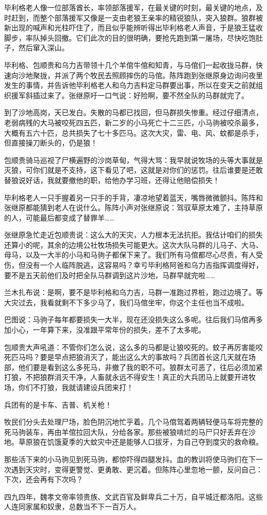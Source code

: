 \par 毕利格老人像一位部落酋长，率领部落援军，在最关键的时刻，最关键的地点，及时赶到，而整个部落援军又像是一支由老狼王亲率的精锐狼队，突入狼群。狼群被新出现的喊声和光柱吓住了，而且似乎能辨听得出毕利格老人声音，于是狼王猛收脚步，率队掉头回撤。它们此次的目的很明确，要抢先跑到第一屠场，尽快吃饱肚子，然后窜入深山。
\par 毕利格、包顺贵和乌力吉带领十几个羊倌牛倌和知青，与马倌们一起收拢马群，快速向沙地聚拢，并派了两个牧民去照顾摔伤的马倌。陈阵跑到张继原身边询问夜里发生的事情，并告诉他毕利格老人和乌力吉料定马群要出事，所以在变天之前就组织援军斜插过来了。张继原吁一口气说：好险啊，要不然全队的马群就完了。
\par 到了沙地高岗，天已发白。失散的马都已找回，但马群损失惨重。经过仔细清点，老弱病残的大马被咬死四五匹，新二岁的小马死亡十二三匹，小马驹被咬杀最多，大概有五六十匹，总共损失了七十多匹马。这次大灾，雷、电、风、蚊都是杀手，但直接操刀断头的，仍是狼！
\par 包顺贵骑马巡视了尸横遍野的沙岗草甸，气得大骂：我早就说牧场的头等大事就是灭狼，可你们就是不支持，这下看见了吧，这就是对你们的惩罚。往后谁要是还敢替狼说好话，我就要撤他的职，给他办学习班，还得让他赔偿损失！
\par 毕利格老人一只手握着另一只手的手背，凄凉地望着蓝天，嘴唇微微颤抖。陈阵和张继原都能猜到老人在说什么。陈阵小声对张继原说：驾驭草原太难了，主持草原的人，可能最后都变成了替罪羊……
\par 张继原急忙走近包顺贵说：这么大的天灾，人力根本无法抗拒。我估计咱们的损失还算小的呢，其余的边境公社牧场损失可能更大。这次大队马群的儿马子、大马、母马，以及一大半的小马和马驹子都保下来了。我们所有马倌都尽心尽责，有人受伤，但没有一个人临阵脱逃，这容易吗？幸亏毕利格阿爸和乌力吉指挥调度得好，要不是五天前他们及时把全队马群调到这片沙地，马群早就完啦……
\par 兰木扎布说：是啊，要不是毕利格和乌力吉，马群一准跑过界桩，跑过边境了。等大灾过去，我看就剩不下多少马了，我们马倌坐牢，你这个主任也当不成啦。
\par 巴图说：马驹子每年都要损失一大半，现在还没损失这么多呢。往后我们马倌再多加小心，一年算下来，没准跟平常年份的损失，差不了太多呢。
\par 包顺贵大声吼道：不管你们怎么说，这么多的马都是让狼咬死的。蚊子再厉害能咬死匹马吗？要是早点把狼消灭了，能出这么大的事故吗？兵团首长这几天就在场部，他们要是看到这么多死马，非撤了我的职不可。狼群太可恶了，往后必须加紧打狼，不把狼群消灭干净，人畜就永远不得安生！真正的大兵团马上就要开进牧场，你们不打狼，我就请建设兵团来打！
\par 兵团有的是卡车、吉普、机关枪！
\par 牧民们分头去处理尸场，脸色阴沉地忙乎着。几个马倌驾着两辆轻便马车将完整的死马驹装车，再由羊倌拉回大队，分给各家。那些被狼啃烂的马尸只好丢弃在沙地。草原狼在饥饿夏季的大蚊灾中还是能够人口拔牙，为自己夺到度灾的救命粮。
\par 那些活下来的小马驹见到死马驹，都惊吓得四腿发抖。血的教训将使马驹们在下一次遇到天灾时，变得更警觉、更勇敢、更沉着。但陈阵心里忽地一颤，反问自己：下次，还会再有下次吗？
\par 四九四年，魏孝文帝率领贵族、文武百官及鲜卑兵二十万，自平城迁都洛阳。这些人连同家属和奴隶，总数当不下一百万人。
    

